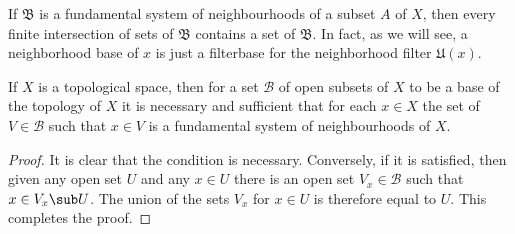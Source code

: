If $\mathfrak{B}$ is a fundamental system of neighbourhoods of a subset $A$ of $X$, then every finite intersection of sets of $\mathfrak{B}$ contains a set of $\mathfrak{B}$. In fact, as we will see, a neighborhood base of $x$ is just a filterbase for the neighborhood filter $\mathfrak{U}(x)$.
\begin{proposition}\label{topo space base iff}
If $X$ is a topological space, then for a set $\mathcal{B}$ of open subsets of $X$ to be a base of the topology of $X$ it is necessary and sufficient that for each $x\in X$ the set of $V\in\mathcal{B}$ such that $x\in V$ is a fundamental system of neighbourhoods of $X$.
\end{proposition}
\begin{proof}
It is clear that the condition is necessary. Conversely, if it is satisfied, then given any open set $U$ and any $x\in U$ there is an open set $V_x\in\mathcal{B}$ such that $x\in V_x\sub U$. The union of the sets $V_x$ for $x\in U$ is therefore equal to $U$. This completes the proof.
\end{proof}
